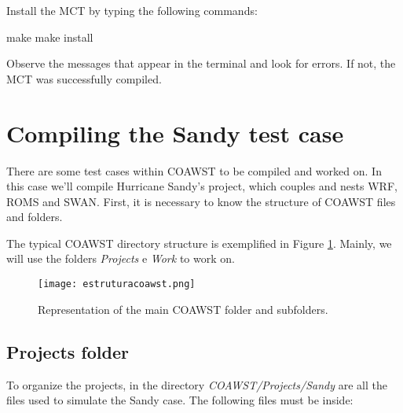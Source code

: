 \noindent Install the MCT by typing the following commands:
\bigskip

\begin{bashcode}
make
make install
\end{bashcode}
\bigskip
\noindent Observe the messages that appear in the terminal and look for errors. If not, the MCT was successfully compiled.
\bigskip


\section{Compiling the Sandy test case}
\bigskip

\noindent There are some test cases within COAWST to be compiled and worked on. In this case we’ll compile Hurricane Sandy’s project,
which couples and nests WRF, ROMS and SWAN. First, it is necessary to know the structure of COAWST files and folders.
\bigskip

\noindent The typical COAWST directory structure is exemplified in Figure \textcolor{bleu_cite}{\ref{pastascoa}}. Mainly, we will use the folders \textit{Projects} e \textit{Work} to work on.
\bigskip

\begin{figure}[H]
    \centering
    \texttt{[image: estruturacoawst.png]}
    \caption{
Representation of the main COAWST folder and subfolders.}
    \label{pastascoa}
\end{figure}
\bigskip

\subsection{Projects folder}
\bigskip

\noindent To organize the projects, in the directory \textit{COAWST/Projects/Sandy} are all the files used to simulate the
Sandy case. The following files must be inside:
\bigskip

